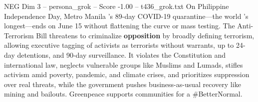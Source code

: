 \begin{textsample}{NEG Dim 3 – persona\_grok – Score -1.00 – t436\_grok.txt}  \label{ex:f3_neg_030}
On Philippine Independence Day, Metro Manila 's 89-day COVID-19 quarantine—the world 's longest—ends on June 15 without flattening the curve or mass testing.
The Anti-Terrorism Bill threatens to criminalize \textbf{opposition} by broadly defining terrorism, allowing executive tagging of activists as terrorists without warrants, up to 24-day detentions, and 90-day surveillance.
It violates the Constitution and international law, neglects vulnerable groups like Muslims and Lumads, stifles activism amid poverty, pandemic, and climate crises, and prioritizes suppression over real threats, while the government pushes business-as-usual recovery like mining and bailouts.
Greenpeace supports communities for a \#BetterNormal.

\end{textsample}

